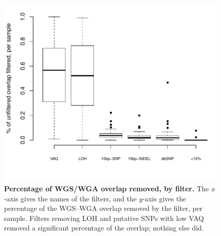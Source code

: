 \documentclass[11pt]{article} %
\begin{document}
\begin{figure}
\centerline{
\includegraphics[width=6in]{boxplot_percent_overlap_filtered.pdf} }
\caption{\textbf{Percentage of WGS/WGA overlap removed, by filter.} The $x$-axis gives the names of the filters, and the $y$-axis gives the percentage of the WGS--WGA overlap removed by the filter, per sample. Filters removing LOH and putative SNPs with low VAQ removed a significant percentage of the overlap; nothing else did.}
\label{fig:boxplot_percent_overlap_filtered}
\end{figure}
\end{document}
